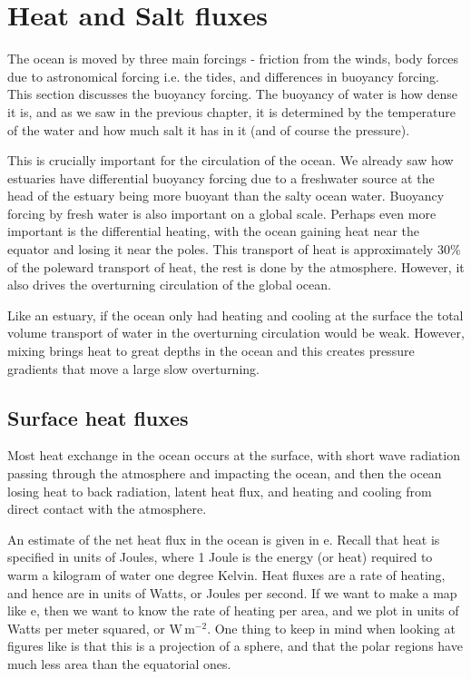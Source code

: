 
\chapter{Heat and Salt fluxes}
\label{ch:heatsaltflux}

The ocean is moved by three main forcings - friction from the winds, body forces due to astronomical forcing i.e. the tides, and differences in buoyancy forcing.  This section discusses the buoyancy forcing.  The buoyancy of water is how dense it is, and as we saw in the previous chapter, it is determined by the temperature of the water and how much salt it has in it (and of course the pressure).  

This is crucially important for the circulation of the ocean.  We already saw how estuaries have differential buoyancy forcing due to a freshwater source at the head of the estuary being more buoyant than the salty ocean water.  Buoyancy forcing by fresh water is also important on a global scale.  Perhaps even more important is the differential heating, with the ocean gaining heat near the equator and losing it near the poles.  This transport of heat is approximately 30\% of the poleward transport of heat, the rest is done by the atmosphere.  However, it also drives the overturning circulation of the global ocean. 

Like an estuary, if the ocean only had heating and cooling at the surface the total volume transport of water in the overturning circulation would be weak.  However, mixing brings heat to great depths in the ocean and this creates pressure gradients that move a large slow overturning.


\section{Surface heat fluxes}

Most heat exchange in the ocean occurs at the surface, with short wave radiation passing through the atmosphere and impacting the ocean, and then the ocean losing heat to back radiation, latent heat flux, and heating and cooling from direct contact with the atmosphere.


An estimate of the net heat flux in the ocean is given in e.  Recall that heat is specified in units of Joules, where 1 Joule is the energy (or heat) required to warm a kilogram of water one degree Kelvin.  Heat fluxes are a rate of heating, and hence are in units of Watts, or Joules per second.  If we want to make a map like e, then we want to know the rate of heating per area, and we plot in units of Watts per meter squared, or $\mathrm{W\,m^{-2}}$.  One thing to keep in mind when looking at figures like  is that this is a projection of a sphere, and that the polar regions have much less area than the equatorial ones.  

